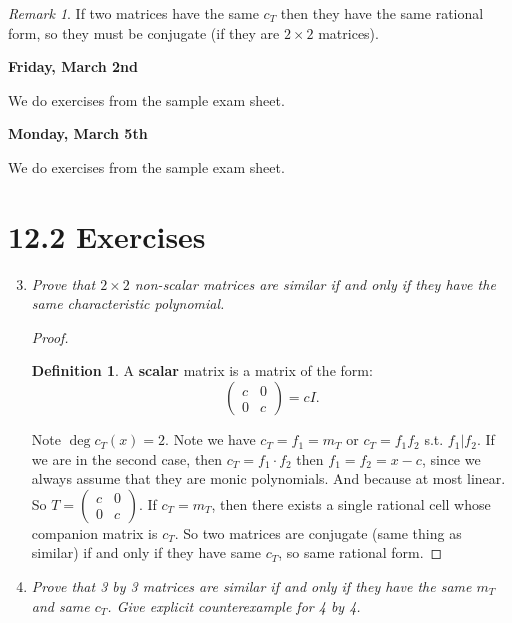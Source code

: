 \documentclass[9pt,reqno,twoside]{amsbook}
\theoremstyle{plain}
\numberwithin{section}{chapter}
\numberwithin{equation}{chapter}
\theoremstyle{definition}
\newtheorem{Def}[theorem]{Definition}
\theoremstyle{remark}
\newtheorem{rem}[theorem]{Remark}
\theoremstyle{plain}
\newcommand{\lpar}{\left(}
\newcommand{\rpar}{\right)}
\begin{document}
\begin{rem}
If two matrices have the same $c_T$ then they have the same rational form, so they must be conjugate (if they are $2 \times 2$ matrices).
\end{rem}

\textbf{Friday, March 2nd}

We do exercises from the sample exam sheet. 

\textbf{Monday, March 5th}

We do exercises from the sample exam sheet. 

\section*{12.2 Exercises}

\begin{enumerate}[label = \arabic*.]

\setcounter{enumi}{2}
\item \textit{Prove that $2 \times 2$ non-scalar matrices are similar if and only if they have the same characteristic polynomial. }


\begin{proof}
\begin{Def}
A \textbf{scalar} matrix is a matrix of the form:
$$
\lpar \begin{array}{cc}
c & 0\\
0 & c
\end{array} \rpar  = cI.
$$
\end{Def}

Note $\deg c_T(x) = 2$. Note we have $c_T = f_1 = m_T$ or $c_T = f_1f_2$ s.t. $f_1|f_2$. If we are in the second case, then $c_T = f_1\cdot f_2$ then $f_1 = f_2 = x -c$, since we always assume that they are monic polynomials. And because at most linear. So $T = \lpar 
\begin{array}{cc}
c & 0\\
0 & c
\end{array} \rpar$. If $c_T = m_T$, then there exists a single rational cell whose companion matrix is $c_T$. So two matrices are conjugate (same thing as similar) if and only if they have same $c_T$, so same rational form. 

\end{proof}

\item \textit{Prove that 3 by 3 matrices are similar if and only if they have the same $m_T$ and same $c_T$. Give explicit counterexample for 4 by 4.}


\end{enumerate}
\end{document}
